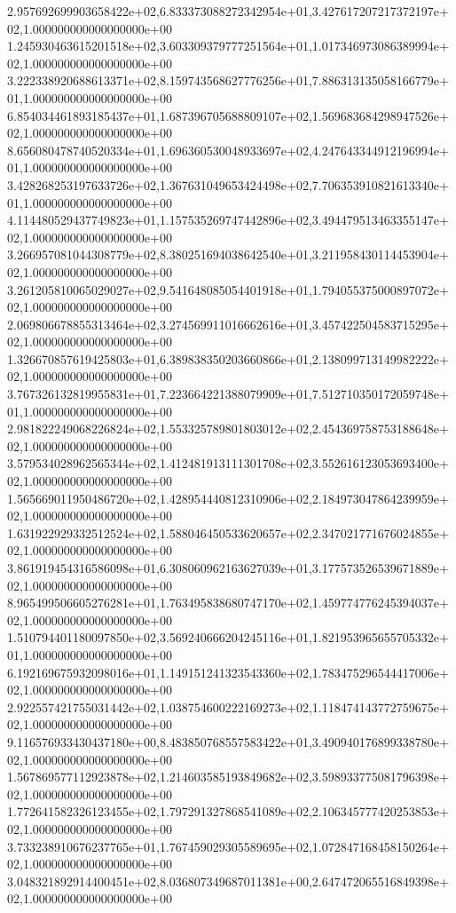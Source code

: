 2.957692699903658422e+02,6.833373088272342954e+01,3.427617207217372197e+02,1.000000000000000000e+00
1.245930463615201518e+02,3.603309379777251564e+01,1.017346973086389994e+02,1.000000000000000000e+00
3.222338920688613371e+02,8.159743568627776256e+01,7.886313135058166779e+01,1.000000000000000000e+00
6.854034461893185437e+01,1.687396705688809107e+02,1.569683684298947526e+02,1.000000000000000000e+00
8.656080478740520334e+01,1.696360530048933697e+02,4.247643344912196994e+01,1.000000000000000000e+00
3.428268253197633726e+02,1.367631049653424498e+02,7.706353910821613340e+01,1.000000000000000000e+00
4.114480529437749823e+01,1.157535269747442896e+02,3.494479513463355147e+02,1.000000000000000000e+00
3.266957081044308779e+02,8.380251694038642540e+01,3.211958430114453904e+02,1.000000000000000000e+00
3.261205810065029027e+02,9.541648085054401918e+01,1.794055375000897072e+02,1.000000000000000000e+00
2.069806678855313464e+02,3.274569911016662616e+01,3.457422504583715295e+02,1.000000000000000000e+00
1.326670857619425803e+01,6.389838350203660866e+01,2.138099713149982222e+02,1.000000000000000000e+00
3.767326132819955831e+01,7.223664221388079909e+01,7.512710350172059748e+01,1.000000000000000000e+00
2.981822249068226824e+02,1.553325789801803012e+02,2.454369758753188648e+02,1.000000000000000000e+00
3.579534028962565344e+02,1.412481913111301708e+02,3.552616123053693400e+02,1.000000000000000000e+00
1.565669011950486720e+02,1.428954440812310906e+02,2.184973047864239959e+02,1.000000000000000000e+00
1.631922929332512524e+02,1.588046450533620657e+02,2.347021771676024855e+02,1.000000000000000000e+00
3.861919454316586098e+01,6.308060962163627039e+01,3.177573526539671889e+02,1.000000000000000000e+00
8.965499506605276281e+01,1.763495838680747170e+02,1.459774776245394037e+02,1.000000000000000000e+00
1.510794401180097850e+02,3.569240666204245116e+01,1.821953965655705332e+01,1.000000000000000000e+00
6.192169675932098016e+01,1.149151241323543360e+02,1.783475296544417006e+02,1.000000000000000000e+00
2.922557421755031442e+02,1.038754600222169273e+02,1.118474143772759675e+02,1.000000000000000000e+00
9.116576933430437180e+00,8.483850768557583422e+01,3.490940176899338780e+02,1.000000000000000000e+00
1.567869577112923878e+02,1.214603585193849682e+02,3.598933775081796398e+02,1.000000000000000000e+00
1.772641582326123455e+02,1.797291327868541089e+02,2.106345777420253853e+02,1.000000000000000000e+00
3.733238910676237765e+01,1.767459029305589695e+02,1.072847168458150264e+02,1.000000000000000000e+00
3.048321892914400451e+02,8.036807349687011381e+00,2.647472065516849398e+02,1.000000000000000000e+00
